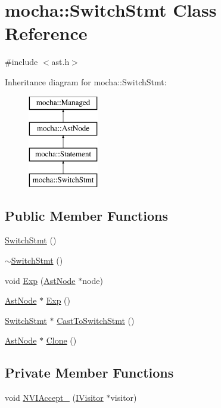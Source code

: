 \hypertarget{classmocha_1_1_switch_stmt}{
\section{mocha::SwitchStmt Class Reference}
\label{classmocha_1_1_switch_stmt}
}


{\ttfamily \#include $<$ast.h$>$}

Inheritance diagram for mocha::SwitchStmt:\begin{figure}[H]
\begin{center}
\leavevmode
\includegraphics[height=4.000000cm]{classmocha_1_1_switch_stmt}
\end{center}
\end{figure}
\subsection*{Public Member Functions}
\begin{DoxyCompactItemize}
\item 
\hyperlink{classmocha_1_1_switch_stmt_ad6f23b6a3421b021f9a4053bd143b30d}{SwitchStmt} ()
\item 
\hyperlink{classmocha_1_1_switch_stmt_a55810eefd93e9092cda600b0bbf5d6b3}{$\sim$SwitchStmt} ()
\item 
void \hyperlink{classmocha_1_1_switch_stmt_a38c01acbf2196e93a01ded96880b9724}{Exp} (\hyperlink{classmocha_1_1_ast_node}{AstNode} $\ast$node)
\item 
\hyperlink{classmocha_1_1_ast_node}{AstNode} $\ast$ \hyperlink{classmocha_1_1_switch_stmt_ad93f539f98b07e9422b29c90a3a9e373}{Exp} ()
\item 
\hyperlink{classmocha_1_1_switch_stmt}{SwitchStmt} $\ast$ \hyperlink{classmocha_1_1_switch_stmt_a870ac8c77e48dcc159926655aa1981e3}{CastToSwitchStmt} ()
\item 
\hyperlink{classmocha_1_1_ast_node}{AstNode} $\ast$ \hyperlink{classmocha_1_1_switch_stmt_a1a0c1a1619e05962d535fe9dfe56fb95}{Clone} ()
\end{DoxyCompactItemize}
\subsection*{Private Member Functions}
\begin{DoxyCompactItemize}
\item 
void \hyperlink{classmocha_1_1_switch_stmt_a2002a4411af51c5c15f0cb619d0e9a90}{NVIAccept\_\-} (\hyperlink{classmocha_1_1_i_visitor}{IVisitor} $\ast$visitor)
\end{DoxyCompactItemize}
